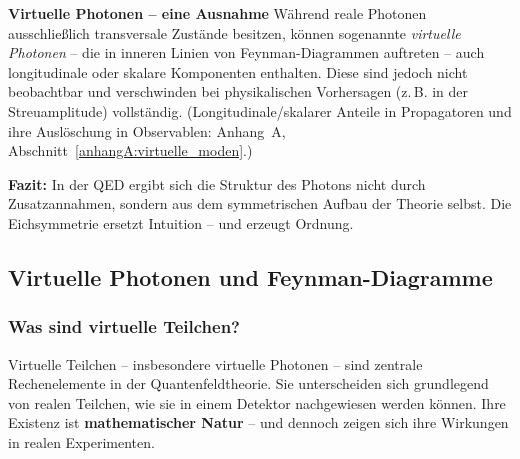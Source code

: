 \textbf{Virtuelle Photonen – eine Ausnahme}
Während reale Photonen ausschließlich transversale Zustände besitzen, können sogenannte \emph{virtuelle Photonen} – die in inneren Linien von Feynman-Diagrammen auftreten – auch longitudinale oder skalare Komponenten enthalten.
Diese sind jedoch nicht beobachtbar und verschwinden bei physikalischen Vorhersagen (z.\,B. in der Streuamplitude) vollständig.
(Longitudinale/skalarer Anteile in Propagatoren und ihre Auslöschung in Observablen: Anhang~A, Abschnitt~\ref{anhangA:virtuelle_moden}.)

\textbf{Fazit:}
In der QED ergibt sich die Struktur des Photons nicht durch Zusatzannahmen, sondern aus dem symmetrischen Aufbau der Theorie selbst. Die Eichsymmetrie ersetzt Intuition – und erzeugt Ordnung.

\subsection{Virtuelle Photonen und Feynman-Diagramme}

\subsubsection{Was sind virtuelle Teilchen?}

Virtuelle Teilchen – insbesondere virtuelle Photonen – sind zentrale Rechenelemente in der Quantenfeldtheorie.
Sie unterscheiden sich grundlegend von realen Teilchen, wie sie in einem Detektor nachgewiesen werden können.
Ihre Existenz ist \textbf{mathematischer Natur} – und dennoch zeigen sich ihre Wirkungen in realen Experimenten.

